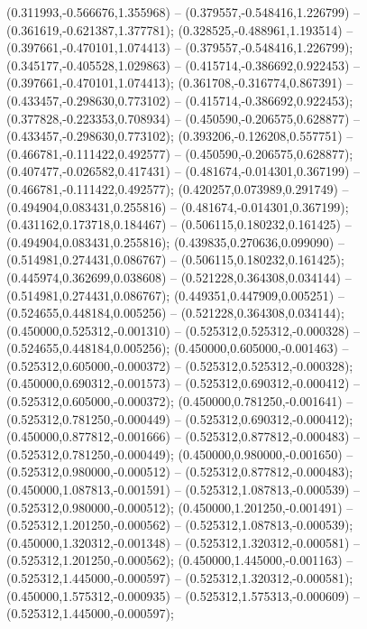  (0.311993,-0.566676,1.355968) -- (0.379557,-0.548416,1.226799) -- (0.361619,-0.621387,1.377781);
 (0.328525,-0.488961,1.193514) -- (0.397661,-0.470101,1.074413) -- (0.379557,-0.548416,1.226799);
 (0.345177,-0.405528,1.029863) -- (0.415714,-0.386692,0.922453) -- (0.397661,-0.470101,1.074413);
 (0.361708,-0.316774,0.867391) -- (0.433457,-0.298630,0.773102) -- (0.415714,-0.386692,0.922453);
 (0.377828,-0.223353,0.708934) -- (0.450590,-0.206575,0.628877) -- (0.433457,-0.298630,0.773102);
 (0.393206,-0.126208,0.557751) -- (0.466781,-0.111422,0.492577) -- (0.450590,-0.206575,0.628877);
 (0.407477,-0.026582,0.417431) -- (0.481674,-0.014301,0.367199) -- (0.466781,-0.111422,0.492577);
 (0.420257,0.073989,0.291749) -- (0.494904,0.083431,0.255816) -- (0.481674,-0.014301,0.367199);
 (0.431162,0.173718,0.184467) -- (0.506115,0.180232,0.161425) -- (0.494904,0.083431,0.255816);
 (0.439835,0.270636,0.099090) -- (0.514981,0.274431,0.086767) -- (0.506115,0.180232,0.161425);
 (0.445974,0.362699,0.038608) -- (0.521228,0.364308,0.034144) -- (0.514981,0.274431,0.086767);
 (0.449351,0.447909,0.005251) -- (0.524655,0.448184,0.005256) -- (0.521228,0.364308,0.034144);
 (0.450000,0.525312,-0.001310) -- (0.525312,0.525312,-0.000328) -- (0.524655,0.448184,0.005256);
 (0.450000,0.605000,-0.001463) -- (0.525312,0.605000,-0.000372) -- (0.525312,0.525312,-0.000328);
 (0.450000,0.690312,-0.001573) -- (0.525312,0.690312,-0.000412) -- (0.525312,0.605000,-0.000372);
 (0.450000,0.781250,-0.001641) -- (0.525312,0.781250,-0.000449) -- (0.525312,0.690312,-0.000412);
 (0.450000,0.877812,-0.001666) -- (0.525312,0.877812,-0.000483) -- (0.525312,0.781250,-0.000449);
 (0.450000,0.980000,-0.001650) -- (0.525312,0.980000,-0.000512) -- (0.525312,0.877812,-0.000483);
 (0.450000,1.087813,-0.001591) -- (0.525312,1.087813,-0.000539) -- (0.525312,0.980000,-0.000512);
 (0.450000,1.201250,-0.001491) -- (0.525312,1.201250,-0.000562) -- (0.525312,1.087813,-0.000539);
 (0.450000,1.320312,-0.001348) -- (0.525312,1.320312,-0.000581) -- (0.525312,1.201250,-0.000562);
 (0.450000,1.445000,-0.001163) -- (0.525312,1.445000,-0.000597) -- (0.525312,1.320312,-0.000581);
 (0.450000,1.575312,-0.000935) -- (0.525312,1.575313,-0.000609) -- (0.525312,1.445000,-0.000597);
